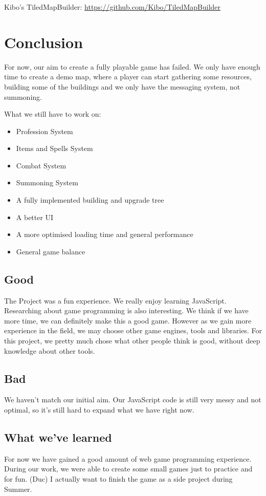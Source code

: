 \documentclass[a4wide, 11pt]{article}
\begin{document}
Kibo’s TiledMapBuilder: \url{https://github.com/Kibo/TiledMapBuilder}

\section{Conclusion}

For now, our aim to create a fully playable game has failed. We only have enough time to create a demo map, where a player can start gathering some resources, building some of the buildings and we only have the messaging system, not summoning.

What we still have to work on:

\begin{itemize}
\item
Profession System

\item
Items and Spells System

\item
Combat System

\item
Summoning System

\item
A fully implemented building and upgrade tree

\item
A better UI

\item
A more optimised loading time and general performance

\item
General game balance
\end{itemize}

\subsection{Good}

The Project was a fun experience. We really enjoy learning JavaScript. Researching about game programming is also interesting. We think if we have more time, we can definitely make this a good game. However as we gain more experience in the field, we may choose other game engines, tools and libraries. For this project, we pretty much chose what other people think is good, without deep knowledge about other tools.

\subsection{Bad}

We haven’t match our initial aim. Our JavaScript code is still very messy and not optimal, so it’s still hard to expand what we have right now.

\subsection{What we've learned}

For now we have gained a good amount of web game programming experience. During our work, we were able to create some small games just to practice and for fun. (Duc) I actually want to finish the game as a side project during Summer.
\end{document}
